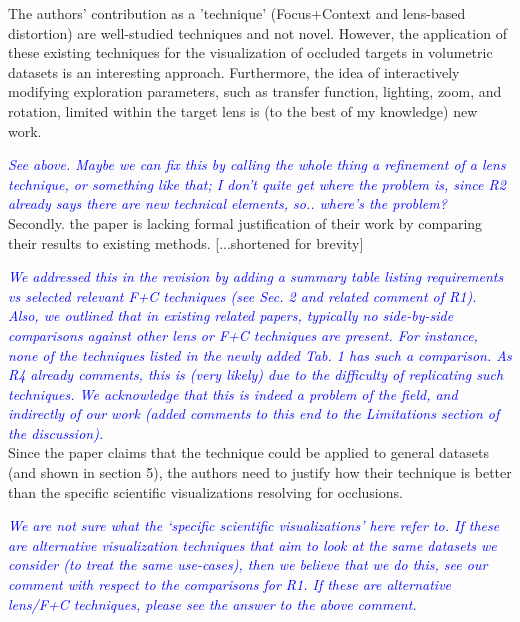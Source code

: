 \documentclass[a4paper,10pt]{article}
\newcommand{\rr}[1]{\emph{\textcolor{blue}{#1}}}
\begin{document}
    The authors' contribution as a 'technique' (Focus+Context and lens-based
    distortion) are well-studied techniques and not novel. However, the application of
    these existing techniques for the visualization of occluded targets in volumetric
    datasets is an interesting approach. Furthermore, the idea of interactively
    modifying exploration parameters, such as transfer function, lighting, zoom, and
    rotation, limited within the target lens is (to the best of my knowledge) new
    work.
    
    \rr{See above. Maybe we can fix this by calling the whole thing a refinement of a lens technique, or something like that; I don't quite get where the problem is, since R2 already says there are new technical elements, so.. where's the problem?}\\

    Secondly. the paper is lacking formal justification of their work by comparing
    their results to existing methods. [...shortened for brevity]
    
    \rr{We addressed this in the revision by adding a summary table listing requirements \emph{vs} selected relevant F+C techniques (see Sec. 2 and related comment of R1). Also, we outlined that in existing related papers, typically no side-by-side comparisons against other lens or F+C techniques are present. For instance, none of the techniques listed in the newly added Tab. 1 has such a comparison. As R4 already comments, this is (very likely) due to the difficulty of replicating such techniques. We acknowledge that this is indeed a problem of the field, and indirectly of our work (added comments to this end to the Limitations section of the discussion).}\\
    
    Since the paper claims that the technique could be applied to
    general datasets (and shown in section 5), the authors need to justify how their
    technique is better than the specific scientific visualizations resolving for
    occlusions.
    
    \rr{We are not sure what the `specific scientific visualizations' here refer to. If these are alternative visualization techniques that aim to look at the same datasets we consider (to treat the same use-cases), then we believe that we do this, see our comment with respect to the comparisons for R1. If these are alternative lens/F+C techniques, please see the answer to the above comment.}\\
    
\end{document}
